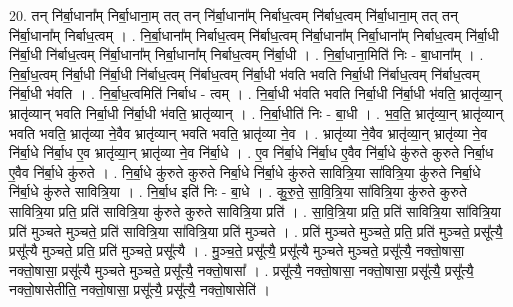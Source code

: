 \documentclass[17pt]{extarticle}
\begin{document}
20. तन् नि॑र्बा॒धाना᳚म् निर्बा॒धाना॒म् तत् तन् नि॑र्बा॒धाना᳚म् निर्बाध॒त्वम् नि॑र्बाध॒त्वम् नि॑र्बा॒धाना॒म् तत् तन् नि॑र्बा॒धाना᳚म् निर्बाध॒त्वम् । . नि॒र्बा॒धाना᳚म् निर्बाध॒त्वम् नि॑र्बाध॒त्वम् नि॑र्बा॒धाना᳚म् निर्बा॒धाना᳚म् निर्बाध॒त्वम् नि॑र्बा॒धी नि॑र्बा॒धी नि॑र्बाध॒त्वम् नि॑र्बा॒धाना᳚म् निर्बा॒धाना᳚म् निर्बाध॒त्वम् नि॑र्बा॒धी । . नि॒र्बा॒धाना॒मिति॑ निः - बा॒धाना᳚म् । . नि॒र्बा॒ध॒त्वम् नि॑र्बा॒धी नि॑र्बा॒धी नि॑र्बाध॒त्वम् नि॑र्बाध॒त्वम् नि॑र्बा॒धी भ॑वति भवति निर्बा॒धी नि॑र्बाध॒त्वम् नि॑र्बाध॒त्वम् नि॑र्बा॒धी भ॑वति । . नि॒र्बा॒ध॒त्वमिति॑ निर्बाध - त्वम् । . नि॒र्बा॒धी भ॑वति भवति निर्बा॒धी नि॑र्बा॒धी भ॑वति॒ भ्रातृ॑व्या॒न् भ्रातृ॑व्यान् भवति निर्बा॒धी नि॑र्बा॒धी भ॑वति॒ भ्रातृ॑व्यान् । . नि॒र्बा॒धीति॑ निः - बा॒धी । . भ॒व॒ति॒ भ्रातृ॑व्या॒न् भ्रातृ॑व्यान् भवति भवति॒ भ्रातृ॑व्या ने॒वैव भ्रातृ॑व्यान् भवति भवति॒ भ्रातृ॑व्या ने॒व । . भ्रातृ॑व्या ने॒वैव भ्रातृ॑व्या॒न् भ्रातृ॑व्या ने॒व नि॑र्बा॒धे नि॑र्बा॒ध ए॒व भ्रातृ॑व्या॒न् भ्रातृ॑व्या ने॒व नि॑र्बा॒धे । . ए॒व नि॑र्बा॒धे नि॑र्बा॒ध ए॒वैव नि॑र्बा॒धे कु॑रुते कुरुते निर्बा॒ध ए॒वैव नि॑र्बा॒धे कु॑रुते । . नि॒र्बा॒धे कु॑रुते कुरुते निर्बा॒धे नि॑र्बा॒धे कु॑रुते सावित्रि॒या सा॑वित्रि॒या कु॑रुते निर्बा॒धे नि॑र्बा॒धे कु॑रुते सावित्रि॒या । . नि॒र्बा॒ध इति॑ निः - बा॒धे । . कु॒रु॒ते॒ सा॒वि॒त्रि॒या सा॑वित्रि॒या कु॑रुते कुरुते सावित्रि॒या प्रति॒ प्रति॑ सावित्रि॒या कु॑रुते कुरुते सावित्रि॒या प्रति॑ । . सा॒वि॒त्रि॒या प्रति॒ प्रति॑ सावित्रि॒या सा॑वित्रि॒या प्रति॑ मुञ्चते मुञ्चते॒ प्रति॑ सावित्रि॒या सा॑वित्रि॒या प्रति॑ मुञ्चते । . प्रति॑ मुञ्चते मुञ्चते॒ प्रति॒ प्रति॑ मुञ्चते॒ प्रसू᳚त्यै॒ प्रसू᳚त्यै मुञ्चते॒ प्रति॒ प्रति॑ मुञ्चते॒ प्रसू᳚त्यै । . मु॒ञ्च॒ते॒ प्रसू᳚त्यै॒ प्रसू᳚त्यै मुञ्चते मुञ्चते॒ प्रसू᳚त्यै॒ नक्तो॒षासा॒ नक्तो॒षासा॒ प्रसू᳚त्यै मुञ्चते मुञ्चते॒ प्रसू᳚त्यै॒ नक्तो॒षासा᳚ । . प्रसू᳚त्यै॒ नक्तो॒षासा॒ नक्तो॒षासा॒ प्रसू᳚त्यै॒ प्रसू᳚त्यै॒ नक्तो॒षासेतीति॒ नक्तो॒षासा॒ प्रसू᳚त्यै॒ प्रसू᳚त्यै॒ नक्तो॒षासेति॑ । \newline
\end{document}
